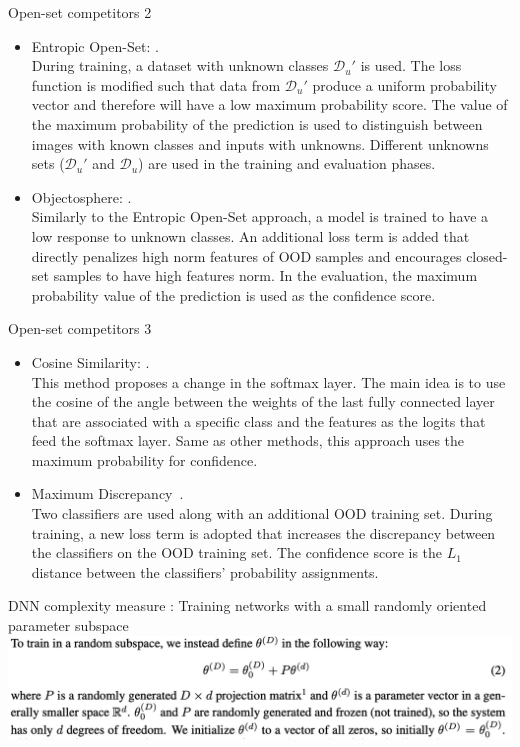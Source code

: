 \documentclass[aspectratio=169]{beamer}
\newcommand{\backupend}{
   \setcounter{framenumber}{\value{finalframe}}
}
\def\Du{\mathcal{D}_u}
\begin{document}
\begin{frame}{Open-set competitors 2}
\begin{itemize}
\item Entropic Open-Set: . \\
During training, a dataset with unknown classes $\Du'$ is used. 
The loss function is modified such that data from $\Du'$ produce a uniform probability vector and therefore will have a low maximum probability score.
The value of the maximum probability of the prediction is used to distinguish between images with known classes and inputs with unknowns.
Different unknowns sets ($\Du'$ and $\Du$) are used in the training and evaluation phases.
\item Objectosphere: . \\
Similarly to the Entropic Open-Set approach, a model is trained to have a low response to unknown classes.
An additional loss term is added that directly penalizes high norm features of OOD samples and encourages closed-set samples to have high features norm.
In the evaluation, the maximum probability value of the prediction is used as the confidence score.
\end{itemize}
\end{frame}

\begin{frame}{Open-set competitors 3}
\begin{itemize}
\item  
Cosine Similarity: . \\
This method proposes a change in the softmax layer.
The main idea is to use the cosine of the angle between the weights of the last fully connected layer that are associated with a specific class and the features as the logits that feed the softmax layer. 
Same as other methods, this approach uses the maximum probability for confidence.

\item 
Maximum Discrepancy~. \\
Two classifiers are used along with an additional OOD training set.
During training, a new loss term is adopted that increases the discrepancy between the classifiers on the OOD training set.
The confidence score is the $L_1$ distance between the classifiers' probability assignments.
\end{itemize}
\end{frame}

\begin{frame}{DNN complexity measure}
:
Training networks with a small randomly oriented parameter subspace
\includegraphics[width=\textwidth]{figures/MEASURING THE INTRINSIC-DIMENSION-OF-OBJECTIVE- LANDSCAPES.png}
\end{frame}

\backupend
\end{document}
